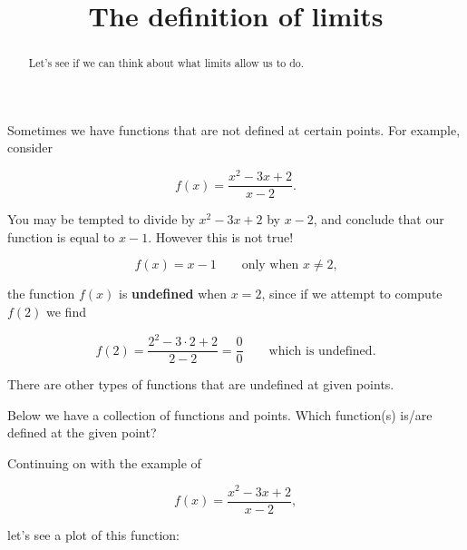 \documentclass{ximera}
\title{The definition of limits}
\begin{document}
\begin{abstract}
  Let's see if we can think about what limits allow us to do.
\end{abstract}
\maketitle


Sometimes we have functions that are not defined at certain
points. For example, consider

\[
f(x) = \frac{x^2 - 3x + 2}{x-2}.
\]

You may be tempted to divide by $x^2 - 3x + 2$ by $x-2$, and conclude
that our function is equal to $x-1$. However this is not true!

\[
f(x) = x-1 \qquad\text{only when $x\ne 2$,}
\]

the function $f(x)$ is \textbf{undefined} when $x= 2$, since if we
attempt to compute $f(2)$ we find

\[
f(2) = \frac{2^2-3\cdot 2+2}{2-2} = \frac{0}{0}\qquad\text{which is  undefined}.
\]

There are other types of functions that are undefined at given points. 

\begin{question}
  Below we have a collection of functions and points. Which
  function(s) is/are defined at the given point?
\begin{solution}
\begin{multiple-choice}
\end{multiple-choice}
\end{solution}
\end{question}


Continuing on with the example of 

\[
f(x) = \frac{x^2 - 3x + 2}{x-2},
\]

let's see a plot of this function:

\begin{image}
\end{image}
\end{document}
